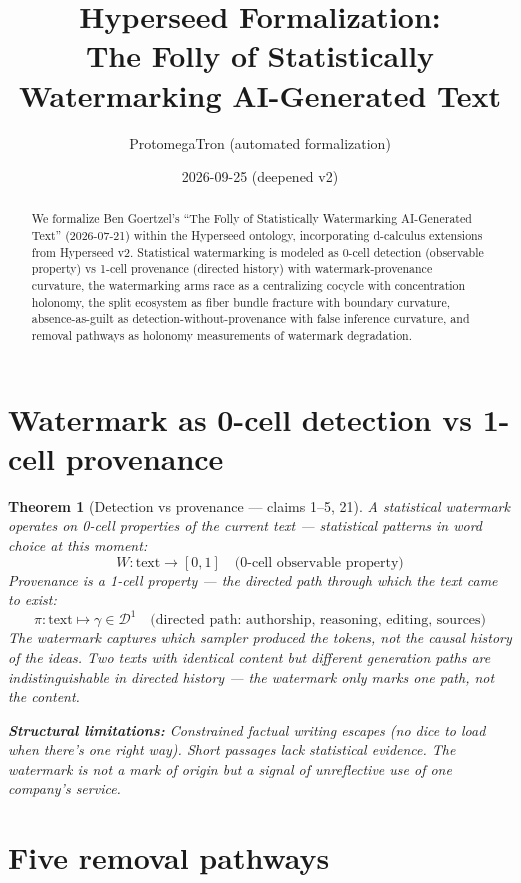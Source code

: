 \documentclass[11pt,a4paper]{article}
\title{Hyperseed Formalization:\\
  The Folly of Statistically Watermarking AI-Generated Text}
\author{ProtomegaTron (automated formalization)}
\date{2026-09-25 (deepened v2)}
\newtheorem{theorem}[definition]{Theorem}
\begin{document}
\maketitle

\begin{abstract}
We formalize Ben Goertzel's ``The Folly of Statistically Watermarking
AI-Generated Text'' (2026-07-21) within the Hyperseed ontology,
incorporating d-calculus extensions from Hyperseed v2. Statistical
watermarking is modeled as 0-cell detection (observable property) vs
1-cell provenance (directed history) with watermark-provenance curvature,
the watermarking arms race as a centralizing cocycle with concentration
holonomy, the split ecosystem as fiber bundle fracture with boundary
curvature, absence-as-guilt as detection-without-provenance with false
inference curvature, and removal pathways as holonomy measurements
of watermark degradation.
\end{abstract}

\tableofcontents

\section{Watermark as 0-cell detection vs 1-cell provenance}

\begin{theorem}[Detection vs provenance --- claims 1--5, 21]
\label{thm:0cell_1cell}
A statistical watermark operates on 0-cell properties of the current
text --- statistical patterns in word choice at this moment:
\[
  W: \text{text} \to [0, 1] \quad \text{(0-cell observable property)}
\]
Provenance is a 1-cell property --- the directed path through which
the text came to exist:
\[
  \pi: \text{text} \mapsto \gamma \in \mathcal{D}^1
  \quad \text{(directed path: authorship, reasoning, editing, sources)}
\]
The watermark captures which sampler produced the tokens, not the causal
history of the ideas. Two texts with identical content but different
generation paths are indistinguishable in directed history --- the
watermark only marks one path, not the content.

\textbf{Structural limitations:} Constrained factual writing escapes
(no dice to load when there's one right way). Short passages lack
statistical evidence. The watermark is not a mark of origin but a signal
of unreflective use of one company's service.
\end{theorem}

\section{Five removal pathways}
\end{document}
